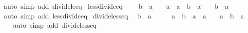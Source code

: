 \begin{isabellebody}
\ {\isacharparenleft}{\kern0pt}auto\ simp\ add{\isacharcolon}{\kern0pt}\ divide{\isacharunderscore}{\kern0pt}le{\isacharunderscore}{\kern0pt}eq{\isacharparenright}{\kern0pt}%
\endisatagproof
{\isafoldproof}%
%
\isadelimproof
\isanewline
%
\endisadelimproof
\isanewline
{}\isamarkupfalse%
\ less{\isacharunderscore}{\kern0pt}divide{\isacharunderscore}{\kern0pt}eq{\isacharunderscore}{\kern0pt}{}{\isacharcolon}{\kern0pt}\isanewline
\ \ {\isachardoublequoteopen}{\isacharparenleft}{\kern0pt}{}\ {\isacharless}{\kern0pt}\ b\ {\isacharslash}{\kern0pt}\ a{\isacharparenright}{\kern0pt}\ {\isacharequal}{\kern0pt}\ {\isacharparenleft}{\kern0pt}{\isacharparenleft}{\kern0pt}{}\ {\isacharless}{\kern0pt}\ a\ {\isasymand}\ a\ {\isacharless}{\kern0pt}\ b{\isacharparenright}{\kern0pt}\ {\isasymor}\ {\isacharparenleft}{\kern0pt}a\ {\isacharless}{\kern0pt}\ {}\ {\isasymand}\ b\ {\isacharless}{\kern0pt}\ a{\isacharparenright}{\kern0pt}{\isacharparenright}{\kern0pt}{\isachardoublequoteclose}\isanewline
%
\isadelimproof
\ \ %
\endisadelimproof
%
\isatagproof
{}\isamarkupfalse%
\ {\isacharparenleft}{\kern0pt}auto\ simp\ add{\isacharcolon}{\kern0pt}\ less{\isacharunderscore}{\kern0pt}divide{\isacharunderscore}{\kern0pt}eq{\isacharparenright}{\kern0pt}%
\endisatagproof
{\isafoldproof}%
%
\isadelimproof
\isanewline
%
\endisadelimproof
\isanewline
{}\isamarkupfalse%
\ divide{\isacharunderscore}{\kern0pt}less{\isacharunderscore}{\kern0pt}eq{\isacharunderscore}{\kern0pt}{}{\isacharcolon}{\kern0pt}\isanewline
\ \ {\isachardoublequoteopen}{\isacharparenleft}{\kern0pt}b\ {\isacharslash}{\kern0pt}\ a\ {\isacharless}{\kern0pt}\ {}{\isacharparenright}{\kern0pt}\ {\isacharequal}{\kern0pt}\ {\isacharparenleft}{\kern0pt}{\isacharparenleft}{\kern0pt}{}\ {\isacharless}{\kern0pt}\ a\ {\isasymand}\ b\ {\isacharless}{\kern0pt}\ a{\isacharparenright}{\kern0pt}\ {\isasymor}\ {\isacharparenleft}{\kern0pt}a\ {\isacharless}{\kern0pt}\ {}\ {\isasymand}\ a\ {\isacharless}{\kern0pt}\ b{\isacharparenright}{\kern0pt}\ {\isasymor}\ a{\isacharequal}{\kern0pt}{}{\isacharparenright}{\kern0pt}{\isachardoublequoteclose}\isanewline
%
\isadelimproof
\ \ %
\endisadelimproof
%
\isatagproof
{}\isamarkupfalse%
\ {\isacharparenleft}{\kern0pt}auto\ simp\ add{\isacharcolon}{\kern0pt}\ divide{\isacharunderscore}{\kern0pt}less{\isacharunderscore}{\kern0pt}eq{\isacharparenright}{\kern0pt}%
\endisatagproof
{\isafoldproof}%
%
\isadelimproof
\isanewline
%
\endisadelimproof

\end{isabellebody}

